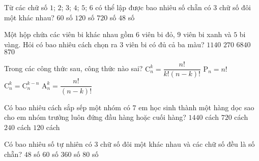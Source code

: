 \begin{ex}%
	Từ các chữ số $1$; $2$; $3$; $4$; $5$; $6$ có thể lập được bao nhiêu số chẵn có $3$ chữ số đôi một khác nhau?
	\choice
	{\True $60$ số}
	{$120$ số}
	{$720$ số}
	{$48$ số}
\end{ex}
\begin{ex}%
	Một hộp chứa các viên bi khác nhau gồm $6$ viên bi đỏ, $9$ viên bi xanh và $5$ bi vàng. Hỏi có bao nhiêu cách chọn ra $3$ viên bi có đủ cả ba màu?
	\choice
	{$1140$}
	{\True $270$}
	{$6840$}
	{$870$}
\end{ex}
\begin{ex}%
	Trong các công thức sau, công thức nào sai?
	\choice
	{$\mathrm{C}_n^k=\dfrac{n!}{k!(n-k)!}$}
	{$\mathrm{P}_n=n!$}
	{\True $\mathrm{C}_n^k=\mathrm{C}_n^{k-n}$}
	{$\mathrm{A}_n^k=\dfrac{n!}{(n-k)!}$}
\end{ex}
\begin{ex}%
Có bao nhiêu cách sắp sếp một nhóm có $7$ em học sinh thành một hàng dọc sao cho em nhóm trưởng luôn đứng đầu hàng hoặc cuối hàng?
\choice
{\True $1440$ cách}
{$720$ cách}
{$240$ cách}
{$120$ cách}
\end{ex}
\begin{ex}%
Có bao nhiêu số tự nhiên có $3$ chữ số đôi một khác nhau và các chữ số đều là số chẵn?
\choice
{\True $48$ số}
{$60$ số}
{$360$ số}
{$80$ số}
\end{ex}
